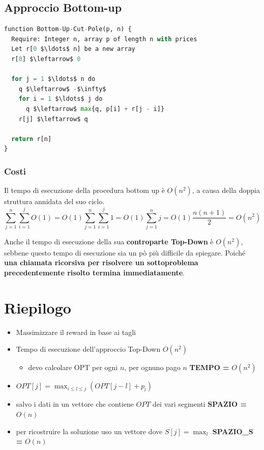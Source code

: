 \subsection{Approccio Bottom-up}

\begin{lstlisting}[language=Python, mathescape=true]
function Bottom-Up-Cut-Pole(p, n) {
  Require: Integer n, array p of length n with prices
  Let r[0 $\ldots$ n] be a new array
  r[0] $\leftarrow$ 0

  for j = 1 $\ldots$ n do
    q $\leftarrow$ -$\infty$
    for i = 1 $\ldots$ j do
      q $\leftarrow$ max{q, p[i] + r[j - i]}
    r[j] $\leftarrow$ q

  return r[n]
}
\end{lstlisting}

\subsubsection{Costi}

Il tempo di esecuzione della procedura bottom up è $O(n^2)$, a causa
della doppia struttura annidata del suo ciclo.
$$
  \sum^n_{j=1} \sum^j_{i=1} O(1) = O(1) \sum^n_{j=1} \sum^j_{i=1} 1 = O(1) \sum^n_{j=1} j = O(1) \frac{n(n+1)}{2} = O(n^2)
$$

Anche il tempo di esecuzione della sua \textbf{controparte Top-Down} è
$O(n^2)$, sebbene questo tempo di esecuzione sia un pò più difficile
da spiegare. Poiché \textbf{una chiamata ricorsiva per risolvere un
  sottoproblema precedentemente risolto termina immediatamente}.

\section{Riepilogo}

\begin{itemize}
  \item
        Massimizzare il reward in base ai tagli
  \item
        Tempo di esecuzione dell'approccio Top-Down $O(n^2)$

        \begin{itemize}
          \item
                devo calcolare OPT per ogni $n$, per ognuno pago $n$ \textbf{TEMPO =}
                $O(n^2)$
        \end{itemize}
  \item
        $OPT[j] = \max_{i \le l \le j} (OPT[j-l] + p_l)$
  \item
        salvo i dati in un vettore che contiene $OPT$ dei vari segmenti
        \textbf{SPAZIO =} $O(n)$
  \item
        per ricostruire la soluzione uso un vettore dove $S[j] = \max_l$
        \textbf{SPAZIO\_S =} $O(n)$
\end{itemize}
